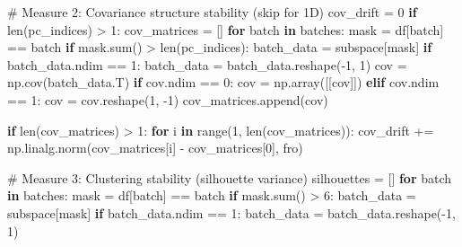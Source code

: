 \documentclass[
  letterpaper,
  DIV=11,
  numbers=noendperiod]{scrartcl}
\newenvironment{Shaded}{\begin{snugshade}}{\end{snugshade}}
\newcommand{\BuiltInTok}[1]{\textcolor[rgb]{0.00,0.23,0.31}{#1}}
\newcommand{\CommentTok}[1]{\textcolor[rgb]{0.37,0.37,0.37}{#1}}
\newcommand{\ControlFlowTok}[1]{\textcolor[rgb]{0.00,0.23,0.31}{\textbf{#1}}}
\newcommand{\DecValTok}[1]{\textcolor[rgb]{0.68,0.00,0.00}{#1}}
\newcommand{\KeywordTok}[1]{\textcolor[rgb]{0.00,0.23,0.31}{\textbf{#1}}}
\newcommand{\NormalTok}[1]{\textcolor[rgb]{0.00,0.23,0.31}{#1}}
\newcommand{\OperatorTok}[1]{\textcolor[rgb]{0.37,0.37,0.37}{#1}}
\newcommand{\StringTok}[1]{\textcolor[rgb]{0.13,0.47,0.30}{#1}}
\renewenvironment{Shaded}{%
  \begin{tcolorbox}[%
    enhanced,%
    colback=codebg,%
    colframe=codebg,%
    borderline west={3pt}{0pt}{sectionblue},%
    fontupper=\small\ttfamily,%
    boxrule=0pt,%
    arc=0pt,%
    boxsep=5pt,%
    left=2mm,%
    right=2mm,%
    top=2mm,%
    bottom=2mm%
  ]%
}{%
  \end{tcolorbox}%
}
\begin{document}
\begin{Shaded}
\begin{Highlighting}[]
    \CommentTok{\# Measure 2: Covariance structure stability (skip for 1D)}
\NormalTok{    cov\_drift }\OperatorTok{=} \DecValTok{0}
    \ControlFlowTok{if} \BuiltInTok{len}\NormalTok{(pc\_indices) }\OperatorTok{\textgreater{}} \DecValTok{1}\NormalTok{:}
\NormalTok{        cov\_matrices }\OperatorTok{=}\NormalTok{ []}
        \ControlFlowTok{for}\NormalTok{ batch }\KeywordTok{in}\NormalTok{ batches:}
\NormalTok{            mask }\OperatorTok{=}\NormalTok{ df[}\StringTok{\textquotesingle{}batch\textquotesingle{}}\NormalTok{] }\OperatorTok{==}\NormalTok{ batch}
            \ControlFlowTok{if}\NormalTok{ mask.}\BuiltInTok{sum}\NormalTok{() }\OperatorTok{\textgreater{}} \BuiltInTok{len}\NormalTok{(pc\_indices):}
\NormalTok{                batch\_data }\OperatorTok{=}\NormalTok{ subspace[mask]}
                \ControlFlowTok{if}\NormalTok{ batch\_data.ndim }\OperatorTok{==} \DecValTok{1}\NormalTok{:}
\NormalTok{                    batch\_data }\OperatorTok{=}\NormalTok{ batch\_data.reshape(}\OperatorTok{{-}}\DecValTok{1}\NormalTok{, }\DecValTok{1}\NormalTok{)}
\NormalTok{                cov }\OperatorTok{=}\NormalTok{ np.cov(batch\_data.T)}
                \ControlFlowTok{if}\NormalTok{ cov.ndim }\OperatorTok{==} \DecValTok{0}\NormalTok{:}
\NormalTok{                    cov }\OperatorTok{=}\NormalTok{ np.array([[cov]])}
                \ControlFlowTok{elif}\NormalTok{ cov.ndim }\OperatorTok{==} \DecValTok{1}\NormalTok{:}
\NormalTok{                    cov }\OperatorTok{=}\NormalTok{ cov.reshape(}\DecValTok{1}\NormalTok{, }\OperatorTok{{-}}\DecValTok{1}\NormalTok{)}
\NormalTok{                cov\_matrices.append(cov)}
        
        \ControlFlowTok{if} \BuiltInTok{len}\NormalTok{(cov\_matrices) }\OperatorTok{\textgreater{}} \DecValTok{1}\NormalTok{:}
            \ControlFlowTok{for}\NormalTok{ i }\KeywordTok{in} \BuiltInTok{range}\NormalTok{(}\DecValTok{1}\NormalTok{, }\BuiltInTok{len}\NormalTok{(cov\_matrices)):}
\NormalTok{                cov\_drift }\OperatorTok{+=}\NormalTok{ np.linalg.norm(cov\_matrices[i] }\OperatorTok{{-}}\NormalTok{ cov\_matrices[}\DecValTok{0}\NormalTok{], }\StringTok{\textquotesingle{}fro\textquotesingle{}}\NormalTok{)}
    
    \CommentTok{\# Measure 3: Clustering stability (silhouette variance)}
\NormalTok{    silhouettes }\OperatorTok{=}\NormalTok{ []}
    \ControlFlowTok{for}\NormalTok{ batch }\KeywordTok{in}\NormalTok{ batches:}
\NormalTok{        mask }\OperatorTok{=}\NormalTok{ df[}\StringTok{\textquotesingle{}batch\textquotesingle{}}\NormalTok{] }\OperatorTok{==}\NormalTok{ batch}
        \ControlFlowTok{if}\NormalTok{ mask.}\BuiltInTok{sum}\NormalTok{() }\OperatorTok{\textgreater{}} \DecValTok{6}\NormalTok{:}
\NormalTok{            batch\_data }\OperatorTok{=}\NormalTok{ subspace[mask]}
            \ControlFlowTok{if}\NormalTok{ batch\_data.ndim }\OperatorTok{==} \DecValTok{1}\NormalTok{:}
\NormalTok{                batch\_data }\OperatorTok{=}\NormalTok{ batch\_data.reshape(}\OperatorTok{{-}}\DecValTok{1}\NormalTok{, }\DecValTok{1}\NormalTok{)}
            

\end{Highlighting}
\end{Shaded}
\end{document}
